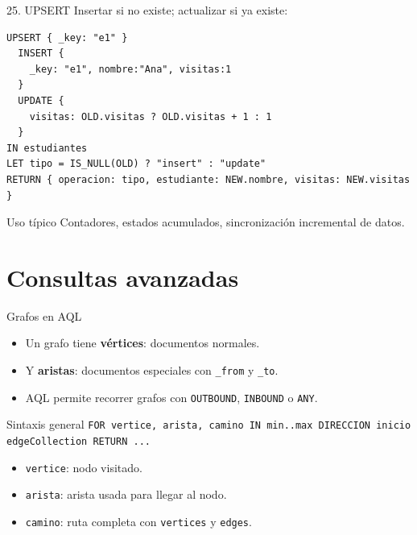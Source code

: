 \documentclass[aspectratio=169,11pt]{beamer}
\begin{document}
\begin{frame}[fragile]{25. UPSERT}
Insertar si no existe; actualizar si ya existe:

\begin{lstlisting}
UPSERT { _key: "e1" }
  INSERT {
    _key: "e1", nombre:"Ana", visitas:1
  }
  UPDATE {
    visitas: OLD.visitas ? OLD.visitas + 1 : 1
  }
IN estudiantes
LET tipo = IS_NULL(OLD) ? "insert" : "update"
RETURN { operacion: tipo, estudiante: NEW.nombre, visitas: NEW.visitas }
\end{lstlisting}

\begin{block}{Uso típico}
Contadores, estados acumulados, sincronización incremental de datos.
\end{block}
\end{frame}

\section{Consultas avanzadas}

\begin{frame}{Grafos en AQL}
\begin{itemize}
  \item Un grafo tiene \textbf{vértices}: documentos normales.
  \item Y \textbf{aristas}: documentos especiales con \texttt{\_from} y \texttt{\_to}.
  \item AQL permite recorrer grafos con \texttt{OUTBOUND}, \texttt{INBOUND} o \texttt{ANY}.
\end{itemize}

\vspace{0.3cm}
\begin{block}{Sintaxis general}
\texttt{FOR vertice, arista, camino IN min..max DIRECCION inicio edgeCollection RETURN ...}
\end{block}

\vspace{0.2cm}
\begin{itemize}
  \item \texttt{vertice}: nodo visitado.
  \item \texttt{arista}: arista usada para llegar al nodo.
  \item \texttt{camino}: ruta completa con \texttt{vertices} y \texttt{edges}.
\end{itemize}
\end{frame}
\end{document}
